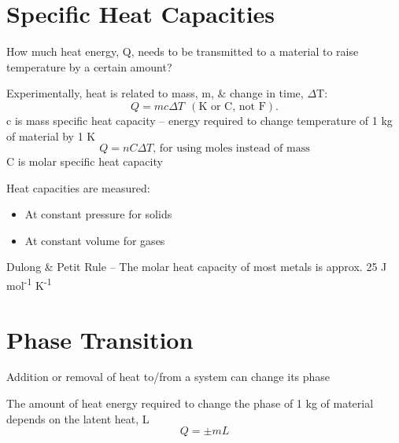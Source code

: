 \documentclass[a4paper, 11pt, normalem]{report}
\begin{document}
\section{Specific Heat Capacities}
How much heat energy, Q, needs to be transmitted to a material to raise temperature by a certain amount?

Experimentally, heat is related to mass, m, \& change in time, ${\Delta}$T:
\begin{equation}
    Q = mc{\Delta}T ~~(\text{K or C, not F}).
\end{equation}
c is mass specific heat capacity -- energy required to change temperature of 1 kg of material by 1 K
\begin{equation}
    Q = nC{\Delta}T\text{, for using moles instead of mass}
\end{equation}
C is molar specific heat capacity

Heat capacities are measured:
\begin{itemize}
    \item At constant pressure for solids
    \item At constant volume for gases
\end{itemize}
Dulong \& Petit Rule -- The molar heat capacity of most metals is approx. 25 J mol\textsuperscript{-1} K\textsuperscript{-1}

\section{Phase Transition}
Addition or removal of heat to/from a system can change its phase

The amount of heat energy required to change the phase of 1 kg of material depends on the latent heat, L
\begin{equation}
    Q = \pm mL
\end{equation}
\end{document}
